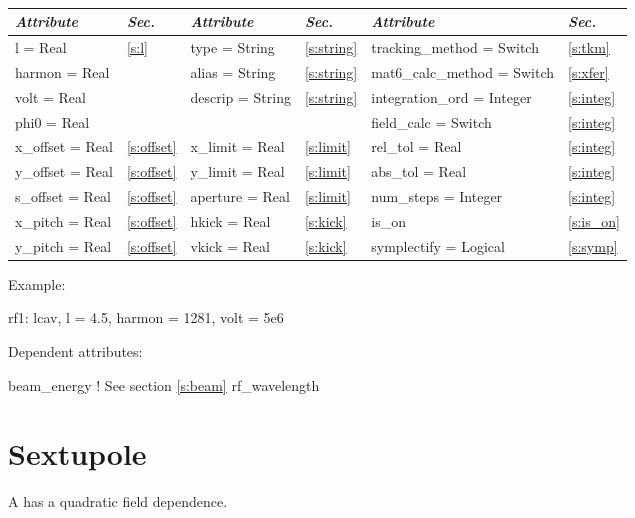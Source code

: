 \toffset
\begin{center}
\tt
\begin{tabular}{|l|l||l|l||l|l|} \hline
  {\sl Attribute} & {\sl Sec.}  & {\sl Attribute} & {\sl Sec.} & {\sl Attribute} & {\sl Sec.} \\ \hline
  l        = Real       & \ref{s:l}      & type = String      & \ref{s:string} & tracking\_method = Switch   & \ref{s:tkm}   \\ \hline
  harmon   = Real       &                & alias = String     & \ref{s:string} & mat6\_calc\_method = Switch & \ref{s:xfer}  \\ \hline
  volt     = Real       &                & descrip = String   & \ref{s:string} & integration\_ord = Integer  & \ref{s:integ} \\ \hline
  phi0     = Real       &                &                    &                & field\_calc = Switch        & \ref{s:integ} \\ \hline
  x\_offset  = Real     & \ref{s:offset} & x\_limit = Real    & \ref{s:limit}  & rel\_tol = Real             & \ref{s:integ} \\ \hline
  y\_offset  = Real     & \ref{s:offset} & y\_limit = Real    & \ref{s:limit}  & abs\_tol = Real             & \ref{s:integ} \\ \hline
  s\_offset  = Real     & \ref{s:offset} & aperture = Real    & \ref{s:limit}  & num\_steps = Integer        & \ref{s:integ} \\ \hline
  x\_pitch = Real       & \ref{s:offset} & hkick    = Real    & \ref{s:kick}   & is\_on                      & \ref{s:is_on} \\ \hline
  y\_pitch = Real       & \ref{s:offset} & vkick    = Real    & \ref{s:kick}   & symplectify = Logical       & \ref{s:symp}  \\ \hline
\end{tabular}
\end{center}
\toffset


\vskip0.05in \noindent
Example:
\begin{example}
  rf1: lcav, l = 4.5, harmon = 1281, volt = 5e6
\end{example}

\vskip0.05in \noindent
Dependent attributes:
\begin{example}
  beam\_energy  ! See section \ref{s:beam}
  rf\_wavelength
\end{example}

\section{Sextupole}
\label{s:sex}
A  has a quadratic field dependence.

